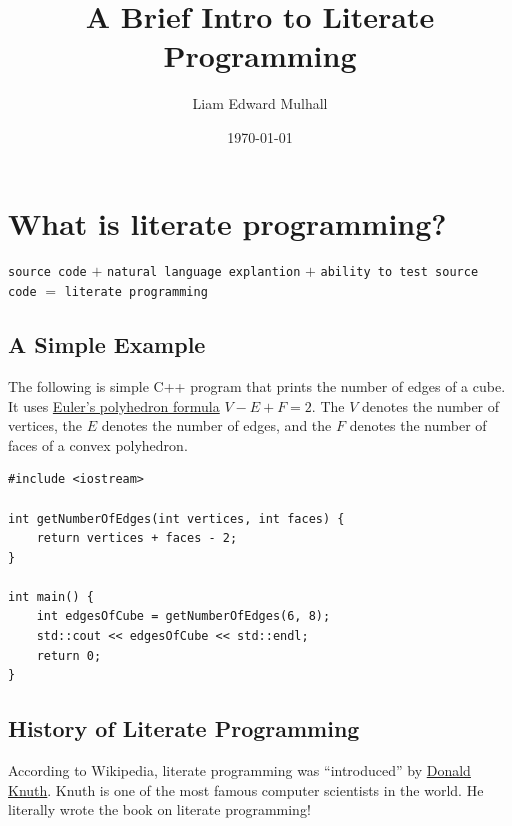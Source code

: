 \documentclass[11pt]{article}
\author{Liam Edward Mulhall}
\date{\today}
\title{A Brief Intro to Literate Programming}
\begin{document}
\maketitle
\tableofcontents


\section*{What is literate programming?}
\label{sec:orgc9b89bd}

\texttt{source code} \(+\) \texttt{natural language explantion} \(+\) \texttt{ability to test source code} \(=\) \texttt{literate programming}

\subsection*{A Simple Example}
\label{sec:orgdfa96e8}

The following is simple C++ program that prints the number of edges of a cube.
It uses \href{https://en.wikipedia.org/wiki/Euler\_characteristic\#Polyhedra}{Euler's polyhedron formula} \(V - E + F = 2.\) The \(V\) denotes the
number of vertices, the \(E\) denotes the number of edges, and the \(F\)
denotes the number of faces of a convex polyhedron.

\begin{verbatim}
#include <iostream>

int getNumberOfEdges(int vertices, int faces) {
    return vertices + faces - 2;
}

int main() {
    int edgesOfCube = getNumberOfEdges(6, 8);
    std::cout << edgesOfCube << std::endl;
    return 0;
}
\end{verbatim}

\subsection*{History of Literate Programming}
\label{sec:org6773501}

According to Wikipedia, literate programming was ``introduced'' by \href{https://en.wikipedia.org/wiki/Donald\_Knuth}{Donald Knuth}.
Knuth is one of the most famous computer scientists in the world. He literally
wrote the book on literate programming!
\end{document}
